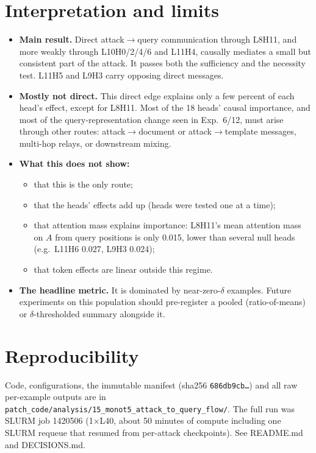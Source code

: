 \documentclass[11pt]{article}
\begin{document}
\section{Interpretation and limits}
\begin{itemize}[nosep]
\item \textbf{Main result.} Direct attack$\rightarrow$query communication
  through L8H11, and more weakly through L10H0/2/4/6 and L11H4, causally
  mediates a small but consistent part of the attack. It passes both the
  sufficiency and the necessity test. L11H5 and L9H3 carry opposing direct
  messages.
\item \textbf{Mostly not direct.} This direct edge explains only a few
  percent of each head's effect, except for L8H11. Most of the 18 heads'
  causal importance, and most of the query-representation change seen in
  Exp.~6/12, must arise through other routes: attack$\rightarrow$document
  or attack$\rightarrow$template messages, multi-hop relays, or downstream
  mixing.
\item \textbf{What this does not show:}
  \begin{itemize}[nosep]
  \item that this is the only route;
  \item that the heads' effects add up (heads were tested one at a time);
  \item that attention mass explains importance: L8H11's mean attention
    mass on $A$ from query positions is only 0.015, lower than several null
    heads (e.g.\ L11H6 0.027, L9H3 0.024);
  \item that token effects are linear outside this regime.
  \end{itemize}
\item \textbf{The headline metric.} It is dominated by near-zero-$\delta$
  examples. Future experiments on this population should pre-register a
  pooled (ratio-of-means) or $\delta$-thresholded summary alongside it.
\end{itemize}

\section*{Reproducibility}
Code, configurations, the immutable manifest (sha256 \texttt{686db9cb\ldots})
and all raw per-example outputs are in
\texttt{patch\_code/analysis/15\_monot5\_attack\_to\_query\_flow/}. The full
run was SLURM job 1420506 (1$\times$L40, about 50 minutes of compute including one SLURM requeue that resumed from per-attack checkpoints). See README.md
and DECISIONS.md.
\end{document}
